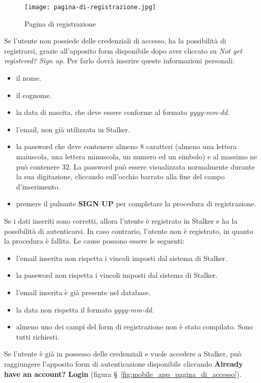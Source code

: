 \documentclass[../manuale-utente.tex]{subfiles}
\begin{document}
\begin{figure}[H]
    \centering
    \texttt{[image: pagina-di-registrazione.jpg]}
    \caption{Pagina di registrazione}%
    \label{fig:mobile_app_pagina_di_registrazione}
\end{figure}
Se l'utente non possiede delle credenziali di accesso, ha la possibilità di registrarsi, grazie all'apposito form disponibile dopo aver cliccato su \textit{Not yet registered? Sign up}. Per farlo dovrà inserire queste informazioni personali:
\begin{itemize}
    \item il nome.
    \item il cognome.
    \item la data di nascita, che deve essere conforme al formato \textit{yyyy-mm-dd}.
    \item l'email, non già utilizzata in Stalker.
    \item la password che deve contenere almeno 8 caratteri (almeno una lettera maiuscola, una lettera minuscola, un numero ed un simbolo) e al massimo ne può contenere 32. La password può essere visualizzata normalmente durante la sua digitazione, cliccando sull'occhio barrato alla fine del campo d'inserimento.
    \item premere il pulsante \textbf{SIGN UP} per completare la procedura di registrazione.
\end{itemize}
Se i dati inseriti sono corretti, allora l'utente è registrato in Stalker e ha la possibilità di autenticarsi.
In caso contrario, l'utente non è registrato, in quanto la procedura è fallita.
Le cause possono essere le seguenti:
\begin{itemize}
    \item l'email inserita non rispetta i vincoli imposti dal sistema di Stalker.
    \item la password non rispetta i vincoli imposti dal sistema di Stalker.
    \item l'email inserita è già presente nel database.
    \item la data non rispetta il formato \textit{yyyy-mm-dd}.
    \item almeno uno dei campi del form di registrazione non è stato compilato. Sono tutti richiesti.
\end{itemize}
Se l'utente è già in possesso delle credenziali e vuole accedere a Stalker, può raggiungere l'apposito form di autenticazione disponibile cliccando \textbf{Already have an account? Login} (figura §~\ref{fig:mobile_app_pagina_di_accesso}).
\end{document}
